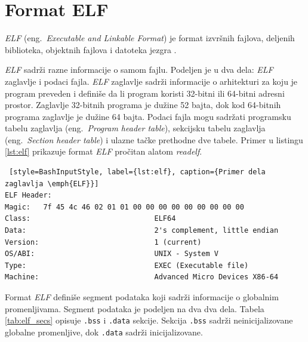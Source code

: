 \documentclass[12pt,oneside]{memoir}
\begin{document}

\section{Format ELF}

\emph{ELF} (eng.~\emph{Executable and Linkable Format}) je format izvršnih fajlova, deljenih biblioteka, objektnih fajlova i datoteka jezgra \cite{ELF}.

\emph{ELF} sadrži razne informacije o samom fajlu. Podeljen je u dva dela: \emph{ELF} zaglavlje i podaci fajla. \emph{ELF} zaglavlje sadrži informacije o arhitekturi za koju je program preveden i definiše da li program koristi 32-bitni ili 64-bitni adresni prostor. Zaglavlje 32-bitnih programa je dužine 52 bajta, dok kod 64-bitnih programa zaglavlje je dužine 64 bajta. Podaci fajla mogu sadržati programsku tabelu zaglavlja (eng.~\emph{Program header table}), sekcijsku tabelu zaglavlja (eng.~\emph{Section header table}) i ulazne tačke prethodne dve tabele. Primer u listingu \ref{lst:elf} prikazuje format \emph{ELF} pročitan alatom \emph{readelf}.

\begin{lstlisting} [style=BashInputStyle, label={lst:elf}, caption={Primer dela zaglavlja \emph{ELF}}]
ELF Header:
Magic:   7f 45 4c 46 02 01 01 00 00 00 00 00 00 00 00 00 
Class:                             ELF64
Data:                              2's complement, little endian
Version:                           1 (current)
OS/ABI:                            UNIX - System V
Type:                              EXEC (Executable file)
Machine:                           Advanced Micro Devices X86-64
\end{lstlisting}

Format \emph{ELF} definiše segment podataka koji sadrži informacije o globalnim promenljivama. Segment podataka je podeljen na dva dva dela. Tabela \ref{tab:elf_secs} opisuje \texttt{.bss} i \texttt{.data} sekcije. Sekcija \texttt{.bss} sadrži neinicijalizovane globalne promenljive, dok \texttt{.data} sadrži inicijalizovane. 
\end{document}
